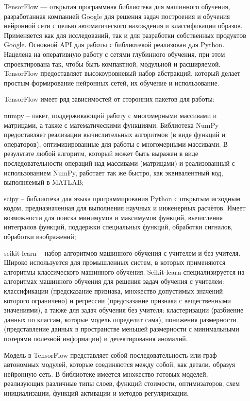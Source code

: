 TensorFlow — открытая программная библиотека для машинного обучения, разработанная компанией Google для решения задач построения и обучения нейронной сети с целью автоматического нахождения и классификации образов. Применяется как для исследований, так и для разработки собственных продуктов Google. Основной API для работы с библиотекой реализован для Python. Нацелена на оперативную работу с сетями глубинного обучения, при этом спроектирована так, чтобы быть компактной, модульной и расширяемой. TensorFlow предоставляет высокоуровневый набор абстракций, который делает простым формирование нейронных сетей, их обучение и использование.

TensorFlow имеет ряд зависимостей от сторонних пакетов для работы:
%
\begin{itemize*}
  \item numpy – пакет, поддерживающий работу с многомерными массивами и матрицами, а также с математическими функциями. Библиотека NumPy предоставляет реализации вычислительных алгоритмов (в виде функций и операторов), оптимизированные для работы с многомерными массивами. В результате любой алгоритм, который может быть выражен в виде последовательности операций над массивами (матрицами) и реализованный с использованием NumPy, работает так же быстро, как эквивалентный код, выполняемый в MATLAB;
  \item scipy – библиотека для языка программирования Python с открытым исходным кодом, предназначенная для выполнения научных и инженерных расчётов. Имеет возможности для поиска минимумов и максимумов функций, вычисления интегралов функций, поддержки специальных функций, обработки сигналов, обработки изображений;
  \item scikit-learn – набор алгоритмов машинного обучения с учителем и без учителя. Широко используется для промышленных систем, в которых применяются алгоритмы классического машинного обучения. Scikit-learn специализируется на алгоритмах машинного обучения для решения задач обучения с учителем: классификации (предсказание признака, множество допустимых значений которого ограничено) и регрессии (предсказание признака с вещественными значениями), а также для задач обучения без учителя: кластеризации (разбиение данных по классам, которые модель определит сама), понижения размерности (представление данных в пространстве меньшей размерности с минимальными потерями полезной информации) и детектирования аномалий.
\end{itemize*}
%

Модель в TensorFlow представляет собой последовательность или граф автономных модулей, которые соединяются между собой, как детали, образуя нейронную сеть. В библиотеке имеется множество готовых моделей, реализующих различные типы слоев, функций стоимости, оптимизаторов, схем инициализации, функций активации и методов регуляризации.


